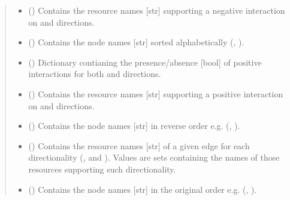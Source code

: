 \documentclass[letterpaper,10pt,english]{sphinxmanual}
\begin{document}
\begin{fulllineitems}
\begin{quote}
\begin{description}
\begin{itemize}
\item {} 
 () \textendash{} Contains the resource names {[}str{]} supporting a negative
interaction on  and 
directions.

\item {} 
 () \textendash{} Contains the node names {[}str{]} sorted alphabetically (,
).

\item {} 
 () \textendash{} Dictionary contianing the presence/absence {[}bool{]} of positive
interactions for both  and 
directions.

\item {} 
 () \textendash{} Contains the resource names {[}str{]} supporting a positive
interaction on  and 
directions.

\item {} 
 () \textendash{} Contains the node names {[}str{]} in reverse order e.g. (,
).

\item {} 
 () \textendash{} Contains the resource names {[}str{]} of a given edge for each
directionality (,  and
). Values are sets containing the names of those
resources supporting such directionality.

\item {} 
 () \textendash{} Contains the node names {[}str{]} in the original order e.g.
(, ).


\end{itemize}
\end{description}
\end{quote}
\end{fulllineitems}
\end{document}
